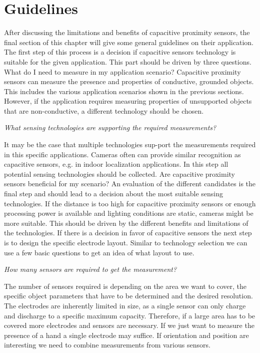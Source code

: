 \section{Guidelines}
After discussing the limitations and benefits of capacitive proximity sensors, the final section of this chapter will give some general guidelines on their application. The first step of this process is a decision if capacitive sensors technology is suitable for the given application. This part should be driven by three questions.
What do I need to measure in my application scenario?
Capacitive proximity sensors can measure the presence and properties of conductive, grounded objects. This includes the various application scenarios shown in the previous sections. However, if the application requires measuring properties of unsupported objects that are non-conductive, a different technology should be chosen.


\textit{What sensing technologies are supporting the required measurements?}


It may be the case that multiple technologies sup-port the measurements required in this specific applications. Cameras often can provide similar recognition as capacitive sensors, e.g. in indoor localization applications. In this step all potential sensing technologies should be collected.
Are capacitive proximity sensors beneficial for my scenario?
An evaluation of the different candidates is the final step and should lead to a decision about the most suitable sensing technologies. If the distance is too high for capacitive proximity sensors or enough processing power is available and lighting conditions are static, cameras might be more suitable. This should be driven by the different benefits and limitations of  the technologies.
If there is a decision in favor of capacitive sensors the next step is to design the specific electrode layout. Similar to technology selection we can use a few basic questions to get an idea of what layout to use.


\textit{How many sensors are required to get the measurement?}


The number of sensors required is depending on the area we want to cover, the specific object parameters that have to be determined and the desired resolution. The electrodes are inherently limited in size, as a single sensor can only charge and discharge to a specific maximum capacity. Therefore, if a large area has to be covered more electrodes and sensors are necessary. If we just want to measure the presence of a hand a single electrode may suffice. If orientation and position are interesting we need to combine measurements from various sensors.


